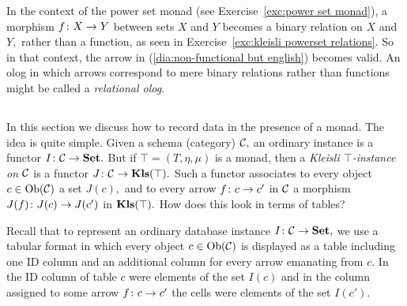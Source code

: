 \documentclass[CT4S-EN-RU]{subfiles}
\begin{document}
\begin{blockRUS}
\end{blockRUS}

\begin{blockENG}
In the context of the power set monad (see Exercise~\ref{exc:power set monad}), a morphism $f\colon X\rightarrow Y$ between sets $X$ and $Y$ becomes a binary relation on $X$ and $Y,$ rather than a function, as seen in Exercise~\ref{exc:kleisli powerset relations}. So in that context, the arrow in (\ref{dia:non-functional but english}) becomes valid. An olog in which arrows correspond to mere binary relations rather than functions might be called a {\em relational olog}.
\end{blockENG}

\begin{blockRUS}
\end{blockRUS}


\subsection{}\label{sec:monads in db}

\begin{blockENG}
In this section we discuss how to record data in the presence of a monad. The idea is quite simple. Given a schema (category) $\mathcal{C},$ an ordinary instance is a functor $I\colon\mathcal{C}\rightarrow{\mathbf{Set}}.$ But if $\top=(T,\eta,\mu)$ is a monad, then a {\em Kleisli $\top$-instance on $\mathcal{C}$} is a functor $J\colon\mathcal{C}\rightarrow{\mathbf{Kls}}(\top).$ Such a functor associates to every object $c\in\textnormal{Ob}(\mathcal{C})$ a set $J(c),$ and to every arrow $f\colon c\rightarrow c'$ in $\mathcal{C}$ a morphism $J(f)\colon J(c)\rightarrow J(c')$ in ${\mathbf{Kls}}(\top).$ How does this look in terms of tables?
\end{blockENG}

\begin{blockRUS}
\end{blockRUS}

\begin{blockENG}
Recall that to represent an ordinary database instance $I\colon\mathcal{C}\rightarrow{\mathbf{Set}},$ we use a tabular format in which every object $c\in\textnormal{Ob}(\mathcal{C})$ is displayed as a table including one ID column and an additional column for every arrow emanating from $c.$ In the ID column of table $c$ were elements of the set $I(c)$ and in the column assigned to some arrow $f\colon c\rightarrow c'$ the cells were elements of the set $I(c').$ 
\end{blockENG}
\end{document}
